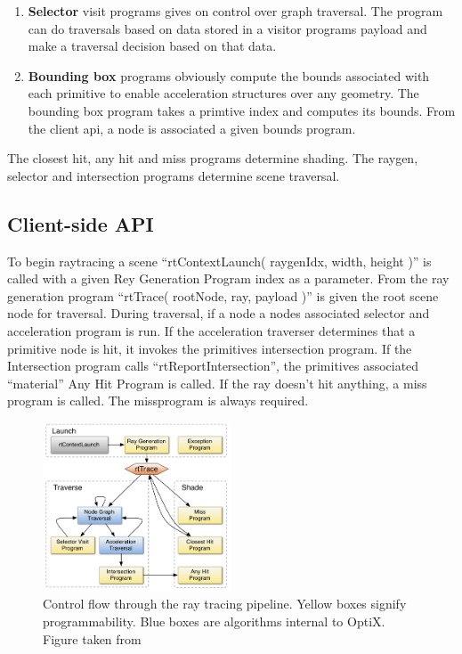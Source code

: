 \begin{enumerate}
	\item{\textbf{Selector}
		visit programs gives on control over graph traversal.
		The program can do traversals based on data stored in a visitor programs payload and make a traversal decision based 	on that data.
	}

 \item{\textbf{Bounding box}
		programs obviously compute the bounds associated with each primitive to enable acceleration structures over any geometry. The bounding box program takes a primtive index and computes its bounds. From the client api, a node is associated a given bounds program.
	}
 				
\end{enumerate}

The closest hit, any hit and miss programs determine shading. The raygen, selector and intersection programs determine scene traversal.
			 
\subsection{Client-side API}

To begin raytracing a scene ``rtContextLaunch( raygenIdx, width, height )'' is called with a given Rey Generation Program index as a parameter. From the ray generation program ``rtTrace( rootNode, ray, payload )'' is given the root scene node for traversal. During traversal, if a node a nodes associated selector and acceleration program is run.
If the acceleration traverser determines that a primitive node is hit, it invokes the primitives intersection program.
If the Intersection program calls ``rtReportIntersection'', the primitives associated ``material'' Any Hit Program is called.
If the ray doesn't hit anything, a miss program is called. The missprogram is always required.

	\begin{figure}[ht]
		\centering
		\includegraphics[width=0.50\textwidth]{Media/raytracer_optix_flow.png}
		\caption{Control flow through the ray tracing pipeline. Yellow boxes signify programmability. Blue boxes are algorithms internal to OptiX. Figure taken from \cite{Parker10OptiX} }
		\label{fig:pipelines}
	\end{figure}

